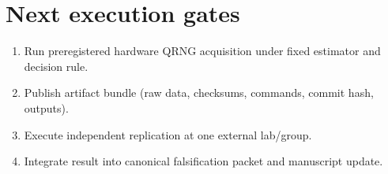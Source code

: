 \documentclass[11pt]{article}
\begin{document}
\section{Next execution gates}
\begin{enumerate}
\item Run preregistered hardware QRNG acquisition under fixed estimator and decision rule.
\item Publish artifact bundle (raw data, checksums, commands, commit hash, outputs).
\item Execute independent replication at one external lab/group.
\item Integrate result into canonical falsification packet and manuscript update.
\end{enumerate}
\end{document}
